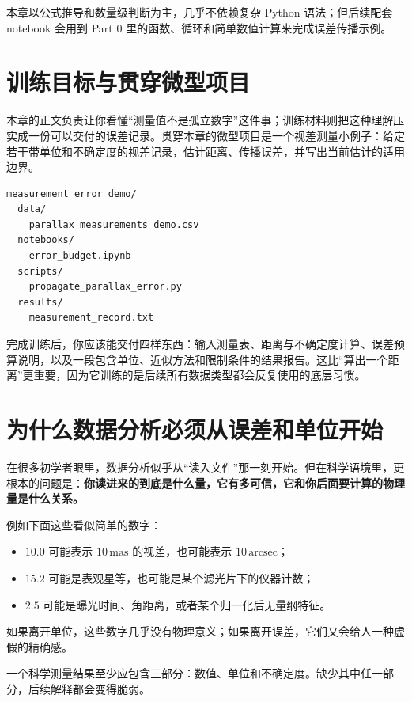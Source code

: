 本章以公式推导和数量级判断为主，几乎不依赖复杂 Python 语法；但后续配套 notebook 会用到 Part 0 里的函数、循环和简单数值计算来完成误差传播示例。

\section{训练目标与贯穿微型项目}

本章的正文负责让你看懂“测量值不是孤立数字”这件事；训练材料则把这种理解压实成一份可以交付的误差记录。贯穿本章的微型项目是一个视差测量小例子：给定若干带单位和不确定度的视差记录，估计距离、传播误差，并写出当前估计的适用边界。

\begin{examplebox}[最小误差项目结构]
\begin{lstlisting}[style=terminal]
measurement_error_demo/
  data/
    parallax_measurements_demo.csv
  notebooks/
    error_budget.ipynb
  scripts/
    propagate_parallax_error.py
  results/
    measurement_record.txt
\end{lstlisting}
\end{examplebox}

完成训练后，你应该能交付四样东西：输入测量表、距离与不确定度计算、误差预算说明，以及一段包含单位、近似方法和限制条件的结果报告。这比“算出一个距离”更重要，因为它训练的是后续所有数据类型都会反复使用的底层习惯。

\section{为什么数据分析必须从误差和单位开始}

在很多初学者眼里，数据分析似乎从“读入文件”那一刻开始。但在科学语境里，更根本的问题是：\textbf{你读进来的到底是什么量，它有多可信，它和你后面要计算的物理量是什么关系。}

例如下面这些看似简单的数字：

\begin{itemize}
    \item $10.0$ 可能表示 $10\,\mathrm{mas}$ 的视差，也可能表示 $10\,\mathrm{arcsec}$；
    \item $15.2$ 可能是表观星等，也可能是某个滤光片下的仪器计数；
    \item $2.5$ 可能是曝光时间、角距离，或者某个归一化后无量纲特征。
\end{itemize}

如果离开单位，这些数字几乎没有物理意义；如果离开误差，它们又会给人一种虚假的精确感。

\begin{defbox}[科学测量的最小表达]
一个科学测量结果至少应包含三部分：数值、单位和不确定度。缺少其中任一部分，后续解释都会变得脆弱。
\end{defbox}

